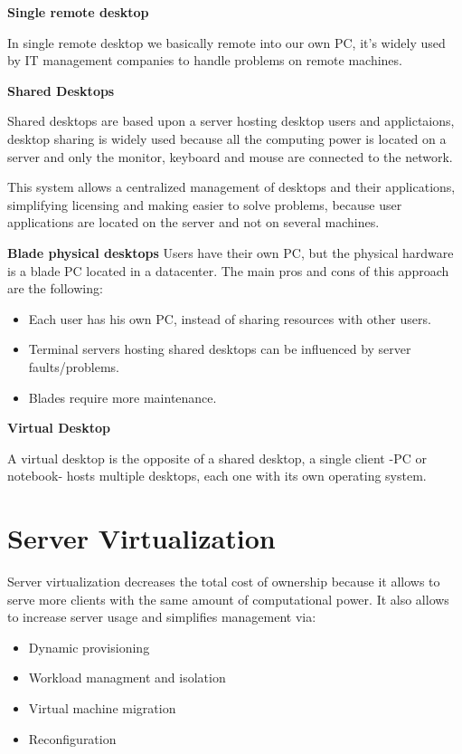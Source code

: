 \textbf{Single remote desktop}

In single remote desktop we basically remote into our own PC, it's widely used by IT management companies to handle problems on remote machines.

\miniSpace
\textbf{Shared Desktops}

Shared desktops are based upon a server hosting desktop users and applictaions, desktop sharing is widely used because all the computing power is located on a server and only the monitor, keyboard and mouse are connected to the network.

This system allows a centralized management of desktops and their applications, simplifying licensing and making easier to solve problems, because user applications are located on the server and not on several machines.

\miniSpace
\textbf{Blade physical desktops}
Users have their own PC, but the physical hardware is a blade PC located in a datacenter. The main pros and cons of this approach are the following:
\begin{itemize}
    \item Each user has his own PC, instead of sharing resources with other users.
    \item Terminal servers hosting shared desktops can be influenced by server faults/problems.
    \item Blades require more maintenance.
\end{itemize}
\textbf{Virtual Desktop}

A virtual desktop is the opposite of a shared desktop, a single client -PC or notebook- hosts multiple desktops, each one with its own operating system.
\section{Server Virtualization}
Server virtualization decreases the total cost of ownership because it allows to serve more clients with the same amount of computational power. It also allows to increase server usage and simplifies management via:
\begin{itemize}
    \item Dynamic provisioning
    \item Workload managment and isolation
    \item Virtual machine migration
    \item Reconfiguration
\end{itemize}